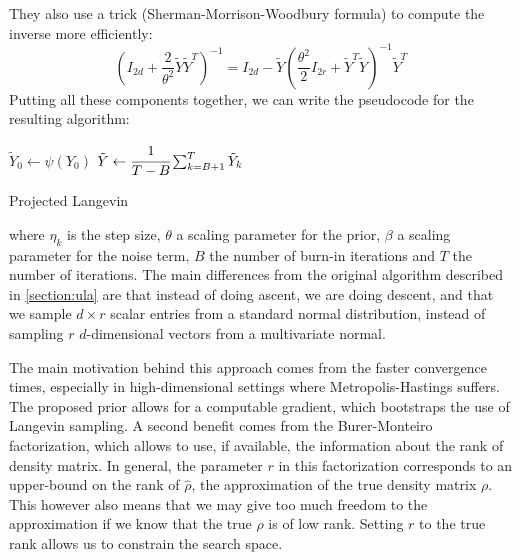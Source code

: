 \documentclass[12pt]{memoir}
\begin{document}
They also use a trick (Sherman-Morrison-Woodbury formula) to compute the inverse more efficiently:
\begin{equation}
\left( I_{2d} + \frac{2}{\theta^2} \tilde Y \tilde Y^{T} \right)^{-1} =  I_{2d} - \tilde Y \left( \frac{\theta^2}{2} I_{2r}+\tilde Y^{T} \tilde Y \right)^{-1} \tilde Y^{T}
\end{equation}
Putting all these components together, we can write the pseudocode for the resulting algorithm:

\begin{algorithm}[H]
    \DontPrintSemicolon

    $\tilde Y_0 \gets \psi(Y_0)$\;
    $\tilde Y \gets \cfrac{1}{T - B} \sum_{k=B+1}^{T} \tilde Y_{k}$\;
    \caption{Projected Langevin}
\end{algorithm}\medbreak
where $\eta_k$ is the step size, $\theta$ a scaling parameter for the prior, $\beta$ a scaling parameter for the noise term, $B$ the number of burn-in iterations and $T$ the number of iterations. The main differences from the original algorithm described in \ref{section:ula} are that instead of doing ascent, we are doing descent, and that we sample $ d\times r$ scalar entries from a standard normal distribution, instead of sampling $r$ $d$-dimensional vectors from a multivariate normal.\medbreak

The main motivation behind this approach comes from the faster convergence times, especially in high-dimensional settings where Metropolis-Hastings suffers. The proposed prior allows for a computable gradient, which bootstraps the use of Langevin sampling. A second benefit comes from the Burer-Monteiro factorization, which allows to use, if available, the information about the rank of density matrix. In general, the parameter $r$ in this factorization corresponds to an upper-bound on the rank of $\hat \rho$, the approximation of the true density matrix $\rho$. This however also means that we may give too much freedom to the approximation if we know that the true $\rho$ is of low rank. Setting $r$ to the true rank allows us to constrain the search space.\medbreak
\end{document}
